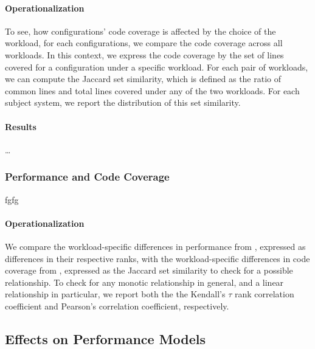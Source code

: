 {\color{blue}
\paragraph{Operationalization} To see, how configurations' code coverage is affected by the choice of the workload, for each configurations, we compare the code coverage across all workloads. In this context, we express the code coverage by the set of lines covered for a configuration under a specific workload. For each pair of workloads, we can compute the Jaccard set similarity, which is defined as the ratio of common lines and total lines covered under any of the two workloads. For each subject system, we report the distribution of this set similarity. 

\paragraph{Results} \ldots
}

\subsubsection{Performance and Code Coverage}\label{sec:performance_coverage_correlation}
fgfg


{\color{blue}
\paragraph{Operationalization} We compare the workload-specific differences in performance from , expressed as differences in their respective ranks, with the workload-specific differences in code coverage from , expressed as the Jaccard set similarity to check for a possible relationship. To check for any monotic relationship in general, and a linear relationship in particular, we report both the the Kendall's $\tau$ rank correlation coefficient and Pearson's correlation coefficient, respectively. 


}
\subsection{Effects on Performance Models}


